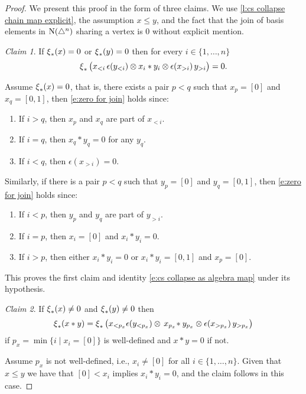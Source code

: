 \begin{proof}
	We present this proof in the form of three claims.
	We use \cref{l:cs collapse chain map explicit}, the assumption $x \leq y$, and the fact that the join of basis elements in $\operatorname{N}(\triangle^n)$ sharing a vertex is $0$ without explicit mention. \newline

	\noindent \textit{Claim 1}.
	If $\operatorname{\xi}_\ast(x) = 0$ or $\operatorname{\xi}_\ast(y) = 0$ then for every $i \in \{1, \dots, n\}$
	\begin{equation} \label{e:zero for join}
	\operatorname{\xi}_\ast \big( x_{<i}\, \epsilon(y_{<i}) \otimes x_i \ast y_i \otimes \epsilon(x_{>i}) \, y_{>i} \big) = 0.
	\end{equation}

	Assume $\operatorname{\xi}_\ast(x) = 0$, that is, there exists a pair $p < q$ such that $x_p = [0]$ and $x_q = [0,1]$, then \eqref{e:zero for join} holds since:
	\begin{enumerate}
		\item If $i > q$, then $x_p$ and $x_q$ are part of $x_{<i}$.
		\item If $i = q$, then $x_q \ast y_q = 0$ for any $y_q$.
		\item If $i < q$, then $\epsilon(x_{>i}) = 0$.
	\end{enumerate}
	Similarly, if there is a pair $p < q$ such that $y_p = [0]$ and $y_q = [0,1]$,  then \eqref{e:zero for join} holds since:
	\begin{enumerate}
		\item If $i < p$, then $y_p$ and $y_q$ are part of $y_{>i}$.
		\item If $i = p$, then $x_i = [0]$ and $x_i \ast y_i = 0$.
		\item If $i > p$, then either $x_i \ast y_i = 0$ or $x_i \ast y_i = [0,1]$ and $x_p = [0]$.
	\end{enumerate}
	This proves the first claim and identity \eqref{e:cs collapse as algebra map} under its hypothesis. \newline

	\noindent \textit{Claim 2}.
	If $\operatorname{\xi}_\ast(x) \neq 0$ and $\operatorname{\xi}_\ast(y) \neq 0$ then
	\[
	\operatorname{\xi}_\ast(x \ast y) =
	\operatorname{\xi}_\ast \big( x_{<p_x} \epsilon(y_{<p_x}) \otimes \, x_{p_x} \! \ast y_{p_x} \otimes \epsilon(x_{>p_x}) \, y_{>p_x} \big)
	\]
	if $p_x = \min \big\{ i \mid x_i = [0] \big\}$ is well-defined and $x \ast y = 0$ if not.

	Assume $p_x$ is not well-defined, i.e., $x_i \neq [0]$ for all $i \in \{1, \dots, n\}$.
	Given that $x \leq y$ we have that $[0] < x_i$ implies $x_i \ast y_i = 0$, and the claim follows in this case.


\end{proof}
